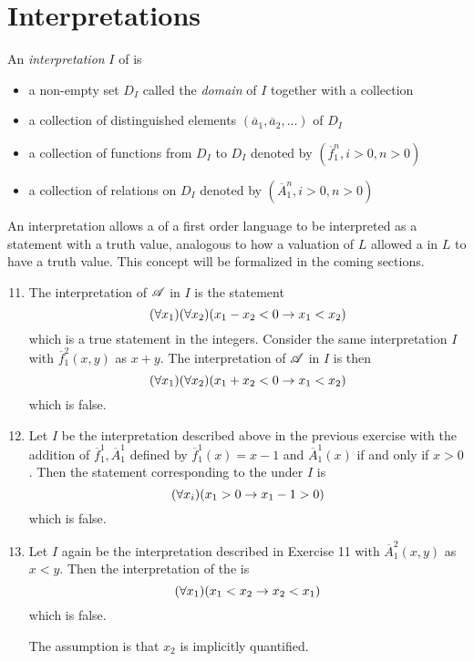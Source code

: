\section{Interpretations}

\setcounter{definition}{13}
\begin{definition}
An \textit{interpretation} \(I\) of \cl is
  \begin{itemize}
    \item a non-empty set \(D_I\) called the \textit{domain} of \(I\) together with a collection 
    \item a collection of distinguished elements \((\overline{a}_1, \overline{a}_2, \dots)\) of \(D_I\)
    \item a collection of functions from \(D_I\) to \(D_I\) denoted by \((\overline{f}^n_1, i> 0, n>0)\)
    \item a collection of relations on \(D_I\) denoted by \((\overline{A}^n_1, i> 0, n>0)\)
  \end{itemize}
\end{definition}

An interpretation allows a \wf{} of a first order language to be interpreted as a statement with a truth value, analogous to how a valuation of \(L\) allowed a \wf{} in \(L\) to have a truth value. This concept will be formalized in the coming sections.

\solutions{}

\begin{enumerate}
  \setcounter{enumi}{10}
  \item The interpretation of \(\mathscr{A}\) in \(I\) is the statement
    \[(\forall x_1) (\forall x_2) (x_1 - x_2 < 0 \rightarrow x_1 < x_2)\]
    which is a true statement in the integers. Consider the same interpretation \(I\) with \(\overline{f}^2_1(x, y)\) as \(x + y\). The interpretation of \(\mathscr{A}\) in \(I\) is then
    \[(\forall x_1) (\forall x_2) (x_1 + x_2 < 0 \rightarrow x_1 < x_2)\]
    which is false.

  \item Let \(I\) be the interpretation described above in the previous exercise with the addition of \(\overline{f}^1_1, \overline{A}^1_1\) defined by \(\overline{f}^1_1(x) = x - 1\) and \(\overline{A}^1_1(x)\) if and only if \(x > 0\). Then the statement corresponding to the \wf{} under \(I\) is
    \[(\forall x_i)(x_1 > 0 \rightarrow x_1 - 1 > 0)\]
    which is false.

  \item Let \(I\) again be the interpretation described in Exercise 11 with \(\overline{A}^2_1(x, y)\) as \(x < y\). Then the interpretation of the \wf{} is
    \[(\forall x_1)(x_1 < x_2 \rightarrow x_2 < x_1)\]
    which is false.

    \note{} The assumption is that \(x_2\) is implicitly quantified.
\end{enumerate}
